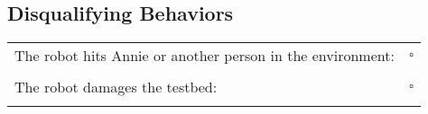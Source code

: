 \subsection*{Disqualifying Behaviors}
\begin{tabular}{ l c}

The robot hits Annie or another person in the environment: & $\square$ \\ \\

The robot damages the testbed: & $\square$ \\ \\

\end{tabular}


